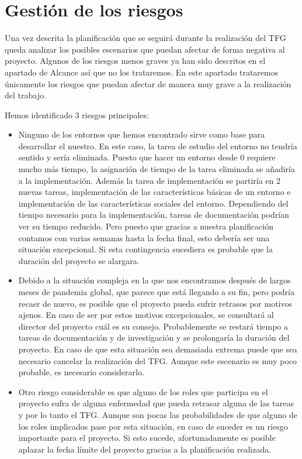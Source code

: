 \chapter{Gestión de los riesgos}
Una vez descrita la planificación que se seguirá durante la realización del TFG queda analizar los posibles escenarios que puedan afectar de forma negativa al proyecto. Algunos de los riesgos menos graves ya han sido descritos en el apartado de Alcance así que no los trataremos. En este apartado trataremos únicamente los riesgos que puedan afectar de manera muy grave a la realización del trabajo.  

Hemos identificado 3 riesgos principales:
\begin{itemize}
    \item Ninguno de los entornos que hemos encontrado sirve como base para desarrollar el nuestro. En este caso, la tarea de estudio del entorno no tendría sentido y sería eliminada. Puesto que hacer un entorno desde 0 requiere mucho más tiempo, la asignación de tiempo de la tarea eliminada se añadiría a la implementación. Además la tarea de implementación se partiría en 2 nuevas tareas, implementación de las características básicas de un entorno e implementación de las características sociales del entorno. Dependiendo del tiempo necesario para la implementación, tareas de documentación podrían ver su tiempo reducido. Pero puesto que gracias a nuestra planificación contamos con varias semanas hasta la fecha final, esto debería ser una situación excepcional. Si esta contingencia sucediera es probable que la duración del proyecto se alargara.
    
    \item Debido a la situación compleja en la que nos encontramos después de largos meses de pandemia global, que parece que está llegando a su fin, pero podría recaer de nuevo, es posible que el proyecto pueda sufrir retrasos por motivos ajenos. En caso de ser por estos motivos excepcionales, se consultará al director del proyecto cuál es su consejo. Probablemente se restará tiempo a tareas de documentación y de investigación y se prolongaría la duración del proyecto. En caso de que esta situación sea demasiada extrema puede que sea necesario cancelar la realización del TFG. Aunque este escenario es muy poco probable, es necesario considerarlo.
    
    \item Otro riesgo considerable es que alguno de los roles que participa en el proyecto sufra de alguna enfermedad que pueda retrasar alguna de las tareas y por lo tanto el TFG. Aunque son pocas las probabilidades de que alguno de los roles implicados pase por esta situación, en caso de suceder es un riesgo importante para el proyecto. Si esto sucede, afortunadamente es posible aplazar la fecha límite del proyecto gracias a la planificación realizada.
\end{itemize}